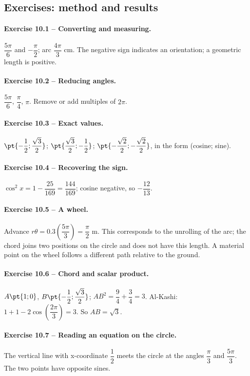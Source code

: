 \subsection*{Exercises: method and results}
\paragraph{Exercise 10.1 -- Converting and measuring.} $\dfrac{5\pi}{6}$ and $-\dfrac{\pi}{2}$; arc $\dfrac{4\pi}{3}$ cm. The negative sign indicates an orientation; a geometric length is positive.
\paragraph{Exercise 10.2 -- Reducing angles.} $\dfrac{5\pi}{6}$, $\dfrac{\pi}{4}$, $\pi$. Remove or add multiples of $2\pi$.
\paragraph{Exercise 10.3 -- Exact values.} $\pt{-\dfrac{1}{2};\dfrac{\sqrt 3}{2}}$; $\pt{\dfrac{\sqrt 3}{2};-\dfrac{1}{2}}$; $\pt{-\dfrac{\sqrt 2}{2};-\dfrac{\sqrt 2}{2}}$, in the form (cosine; sine).
\paragraph{Exercise 10.4 -- Recovering the sign.} $\cos ^2x=1-\dfrac{25}{169}=\dfrac{144}{169}$; cosine negative, so $-\dfrac{12}{13}$.
\paragraph{Exercise 10.5 -- A wheel.} Advance $r\theta =\num{0,3}(\dfrac{5\pi}{3})=\dfrac{\pi}{2}$ m. This corresponds to the unrolling of the arc; the chord joins two positions on the circle and does not have this length. A material point on the wheel follows a different path relative to the ground.
\paragraph{Exercise 10.6 -- Chord and scalar product.} $A\pt{1;0}$, $B\pt{-\dfrac{1}{2};\dfrac{\sqrt 3}{2}}$; $AB^2=\dfrac{9}{4}+\dfrac{3}{4}=3$. Al-Kashi: $1+1-2\cos (\dfrac{2\pi}{3})=3$. So $AB=\sqrt3$.
\paragraph{Exercise 10.7 -- Reading an equation on the circle.} The vertical line with x-coordinate $\dfrac{1}{2}$ meets the circle at the angles $\dfrac{\pi}{3}$ and $\dfrac{5\pi}{3}$. The two points have opposite sines.
